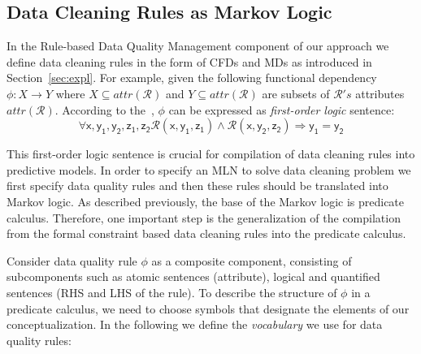 \subsection{Data Cleaning Rules as Markov Logic}
\label{sec:ml}
In the Rule-based Data Quality Management component of our approach %
we define data cleaning rules in the form of CFDs and MDs as introduced in Section~\ref{sec:expl}. For example, given the following functional dependency $\phi: X \rightarrow Y$ where $X \subseteq attr(\mathcal{R}) $ and $Y \subseteq attr(\mathcal{R}) $ are subsets of $\mathcal{R}'s$ attributes $attr(\mathcal{R})$. According to the~\cite{Fagin:1982:HCD:322344.322347}, $\phi$ can be expressed as \textit{first-order logic} sentence:
\begin{equation}
\mathsf{\forall x, y_1, y_2, z_1, z_2 \mathcal{R}(x, y_1, z_1) \wedge \mathcal{R}(x, y_2, z_2) \Rightarrow y_1=y_2}
\label{fd2fol}
\end{equation}

This first-order logic sentence is crucial for compilation of data cleaning rules into predictive models. In order to specify an MLN to solve data cleaning problem we first specify data quality rules and then these rules should be translated into Markov logic. As described previously, the base of the Markov logic is predicate calculus. Therefore, one important step is the generalization of the compilation from the formal constraint based data cleaning rules into the predicate calculus.

Consider data quality rule $\phi$ as a composite component, consisting of subcomponents such as atomic sentences (attribute), logical and quantified sentences (RHS and LHS of the rule). To describe the structure of $\phi$ in a predicate calculus, we need to choose symbols that designate the elements of our conceptualization. In the following we define the \textit{vocabulary} we use for data quality rules:


